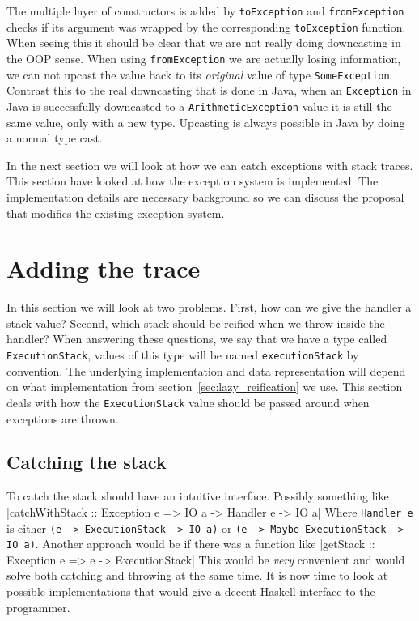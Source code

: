 The multiple layer of constructors is added by \texttt{toException}
and \texttt{fromException} checks if its argument was wrapped by the
corresponding \texttt{toException} function. When seeing this it should
be clear that we are not really doing downcasting in the OOP sense. When using
\texttt{fromException} we are actually losing information, we
can not upcast the value back to its \emph{original} value of type
\texttt{SomeException}. Contrast this to the real downcasting that is
done in Java, when an \texttt{Exception} in Java is successfully
downcasted to a \texttt{ArithmeticException} value it is still the same
value, only with a new type. Upcasting is always possible in Java by
doing a normal type cast.

In the next section we will look at how we can catch exceptions with
stack traces. This section have looked at how the exception system is
implemented. The implementation details are necessary background so we
can discuss the proposal that modifies the existing exception system.

\section{Adding the trace} \label{sec:adding_the_trace}

In this section we will look at two problems. First, how can we give
the handler a stack value? Second, which stack should be reified
when we throw inside the handler? When answering these questions, we
say that we have a type called \texttt{ExecutionStack}, values of
this type will be named \texttt{executionStack} by convention. The
underlying implementation and data representation will depend on what
implementation from section~\ref{sec:lazy_reification} we use. This section
deals with how the \texttt{ExecutionStack} value should be passed around
when exceptions are thrown.

\subsection{Catching the stack}


To catch the stack should have an intuitive interface. Possibly
something like
|catchWithStack :: Exception e => IO a -> Handler e -> IO a|
Where \texttt{Handler e} is either \texttt{(e -> ExecutionStack -> IO a)} or
\texttt{(e -> Maybe ExecutionStack -> IO a)}. Another approach would be
if there was a function like
|getStack :: Exception e => e -> ExecutionStack|
This would be \emph{very} convenient and would solve both catching and
throwing at the same time. It is now time to look at possible
implementations
that would give a decent Haskell-interface to the programmer.

